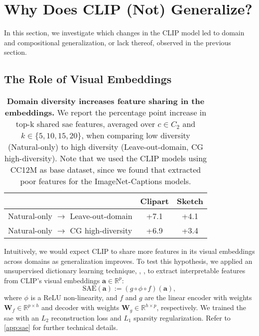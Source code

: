 \section{Why Does CLIP (Not) Generalize?}\label{sec:analysis}
In this section, we investigate which changes in the CLIP model led to domain and compositional generalization, or lack thereof, observed in the previous section.

\subsection{The Role of Visual Embeddings}
\begin{table}[t]
    \centering
    \caption{\textbf{Domain diversity increases feature sharing in the embeddings.}
    We report the percentage point increase in top-k shared \acrshort{sae} features, averaged over $c \in C_2$ and $k \in \{5, 10, 15, 20\}$, when comparing low diversity (Natural-only) to high diversity (Leave-out-domain, CG high-diversity). Note that we used the CLIP models using CC12M as base dataset, since we found that  extracted poor features for the ImageNet-Captions models.
    }
    \begin{tabular}{lcc}
        \toprule
         & Clipart & Sketch \\
        \midrule
        Natural-only $\rightarrow$ Leave-out-domain  & +7.1 & +4.1 \\
        Natural-only $\rightarrow$ CG high-diversity & +6.9 & +3.4 \\
        \bottomrule
    \end{tabular}
    \label{tab:feature-sharing}
\end{table}

Intuitively, we would expect CLIP to share more features in its visual embeddings across domains as generalization improves.
To test this hypothesis, we applied an unsupervised dictionary learning technique, \ie,  \citep{bricken2023monosemanticity,huben2024sparse}, to extract interpretable features from CLIP's visual embeddings $\mathbf{a}\in\mathbb{R}^p$: 
\begin{equation}
    \text{SAE}(\mathbf{a}):=(g\circ\phi\circ f)(\mathbf{a}),
\end{equation}
where $\phi$ is a ReLU non-linearity, and $f$ and $g$ are the linear encoder with weights $\mathbf{W}_f\in\mathbb{R}^{p\times h}$ and decoder with weights $\mathbf{W}_g\in\mathbb{R}^{h\times p}$, respectively. We trained the \acrshort{sae} with an $L_2$ reconstruction loss and $L_1$ sparsity regularization. Refer to \cref{app:sae} for further technical details.

